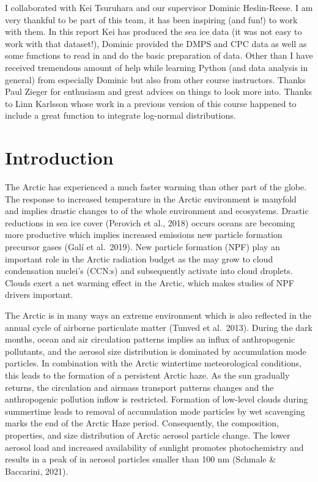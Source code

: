 \documentclass[11pt]{article}
\begin{document}
I collaborated with Kei Tsuruhara and our supervisor Dominic
Heslin-Reese. I am very thankful to be part of this team, it has been
inspiring (and fun!) to work with them. In this report Kei has produced
the sea ice data (it was not easy to work with that dataset!), Dominic
provided the DMPS and CPC data as well as some functions to read in and
do the basic preparation of data. Other than I have received tremendous
amount of help while learning Python (and data analysis in general) from
especially Dominic but also from other course instructors. Thanks Paul
Zieger for enthusiasm and great advices on things to look more into.
Thanks to Linn Karlsson whose work in a previous version of this course
happened to include a great function to integrate log-normal
distributions.

    \hypertarget{introduction}{%
\section{Introduction}\label{introduction}}

The Arctic has experienced a much faster warming than other part of the
globe. The response to increased temperature in the Arctic environment
is manyfold and implies drastic changes to of the whole environment and
ecosystems. Drastic reductions in sea ice cover (Perovich et al., 2018)
occurs oceans are becoming more productive which implies increased
emissions new particle formation precursor gases (Galí et al.~2019). New
particle formation (NPF) play an important role in the Arctic radiation
budget as the may grow to cloud condensation nuclei's (CCN:s) and
subsequently activate into cloud droplets. Clouds exert a net warming
effect in the Arctic, which makes studies of NPF drivers important.

The Arctic is in many ways an extreme environment which is also
reflected in the annual cycle of airborne particulate matter (Tunved et
al.~2013). During the dark months, ocean and air circulation patterns
implies an influx of anthropogenic pollutants, and the aerosol size
distribution is dominated by accumulation mode particles. In combination
with the Arctic wintertime meteorological conditions, this leads to the
formation of a persistent Arctic haze. As the sun gradually returns, the
circulation and airmass transport patterns changes and the anthropogenic
pollution inflow is restricted. Formation of low-level clouds during
summertime leads to removal of accumulation mode particles by wet
scavenging marks the end of the Arctic Haze period. Consequently, the
composition, properties, and size distribution of Arctic aerosol
particle change. The lower aerosol load and increased availability of
sunlight promotes photochemistry and results in a peak of in aerosol
particles smaller than 100 nm (Schmale \& Baccarini, 2021).
\end{document}
